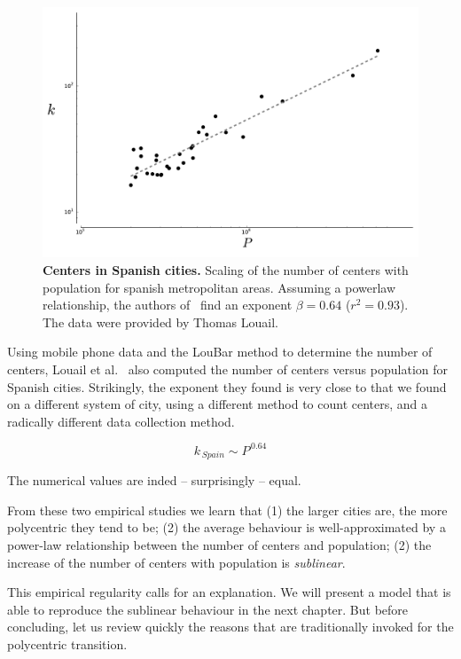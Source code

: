 \begin{figure}
    \centering
    \includegraphics[width=\textwidth]{gfx/chapter-monocentric/spain_num-centers.pdf}
    \caption{{\bf Centers in Spanish cities.} Scaling of the number of centers with population for spanish
        metropolitan areas. Assuming a powerlaw relationship, the authors
    of~\cite{Louail:2014} find an exponent $\beta = 0.64$ ($r^2=0.93$). The data
were provided by Thomas Louail.\label{fig:centers_spain}}
\end{figure}

Using mobile phone data and the LouBar method to determine the number of
centers, Louail et al.~\cite{Louail:2014} also computed the number of centers
versus population for Spanish cities. Strikingly, the exponent they found is
very close to that we found on a different system of city, using a different
method to count centers, and a radically different data collection method.

\begin{equation}
    k_{\,Spain} \sim P^{\,0.64}
\end{equation}

The numerical values are inded -- surprisingly -- equal.

From these two empirical studies we learn that (1) the larger cities are, the
more polycentric they tend to be; (2) the average behaviour is well-approximated
by a power-law relationship between the number of centers and population; (2)
the increase of the number of centers with population is \emph{sublinear}.  

This empirical regularity calls for an explanation. We will present a model that
is able to reproduce the sublinear behaviour in the next chapter. But before
concluding, let us review quickly the reasons that are traditionally
invoked for the polycentric transition.


